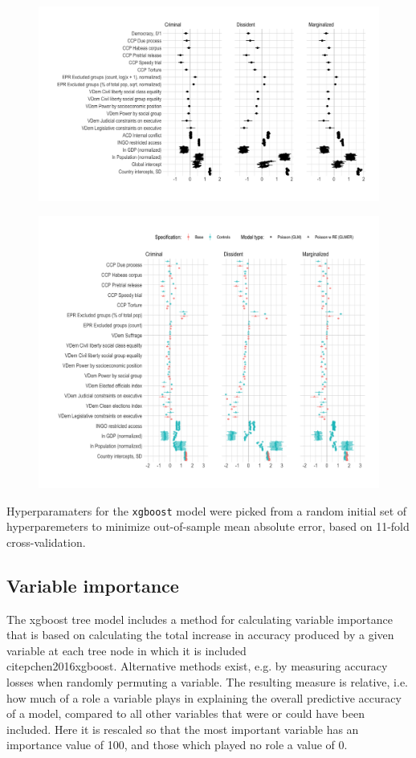 \documentclass[12pt]{article}
\begin{document}
\begin{figure}
\includegraphics[width=.9\textwidth]{../output/figures/model-coefs.png}
\end{figure}


\begin{figure}
\includegraphics[width=.9\textwidth]{../output/figures/model-coefs-all-model-forms.png}
\end{figure}

Hyperparamaters for the \texttt{xgboost} model were picked from a random initial set of hyperparemeters to minimize out-of-sample mean absolute error, based on 11-fold cross-validation. 

\subsection{Variable importance}

The xgboost tree model includes a method for calculating variable importance that is based on calculating the total increase in accuracy produced by a given variable at each tree node in which it is included \\citep{chen2016xgboost}. Alternative methods exist, e.g. by measuring accuracy losses when randomly permuting a variable. The resulting measure is relative, i.e. how much of a role a variable plays in explaining the overall predictive accuracy of a model, compared to all other variables that were or could have been included. Here it is rescaled so that the most important variable has an importance value of 100, and those which played no role a value of 0. 
\end{document}
